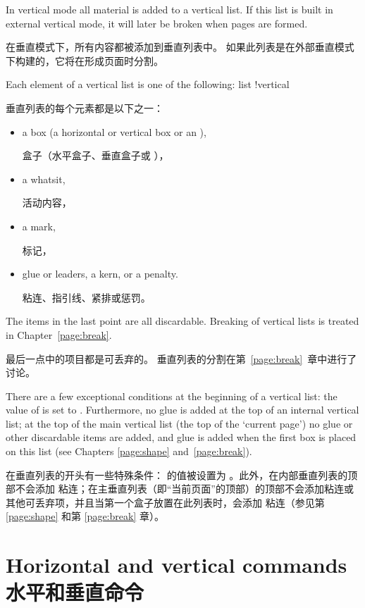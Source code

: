 In vertical mode all material is added to a vertical list.
If this list is built in external vertical mode, it
will later be broken when pages are formed.

在垂直模式下，所有内容都被添加到垂直列表中。
如果此列表是在外部垂直模式下构建的，它将在形成页面时分割。

Each element of a vertical list is one of the following:
\term list !vertical\par

垂直列表的每个元素都是以下之一：
\begin{itemize} \item a box (a horizontal or vertical box or 
an ),

盒子（水平盒子、垂直盒子或 ），
\item a whatsit,

活动内容，
\item a mark,

标记，
\item glue or leaders, a kern, or a penalty.

粘连、指引线、紧排或惩罚。\end{itemize}
The items in the last point are all discardable.
Breaking of vertical lists
is treated in Chapter~\ref{page:break}.

最后一点中的项目都是可丢弃的。
垂直列表的分割在第~\ref{page:break}~章中进行了讨论。

There are a few exceptional conditions at the beginning
of  a vertical list: the value of  is set
to \n{-1000pt}. Furthermore, no  glue is added
at the top of an internal vertical list; 
at the top of the main vertical list (the top of the
`current page') no glue or other discardable items
are added, and  glue is added when the
first box is placed on this list
(see Chapters \ref{page:shape} and~\ref{page:break}).

在垂直列表的开头有一些特殊条件： 的值被设置为 \n{-1000pt}。此外，在内部垂直列表的顶部不会添加  粘连；在主垂直列表（即“当前页面”的顶部）的顶部不会添加粘连或其他可丢弃项，并且当第一个盒子放置在此列表时，会添加  粘连（参见第 \ref{page:shape} 和第 \ref{page:break} 章）。

\section{Horizontal and vertical commands\\水平和垂直命令}

